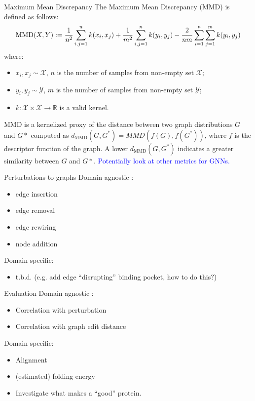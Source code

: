 \documentclass[aspectratio=169, 10pt, dvipsnames, handout]{beamer}
\begin{document}
\begin{frame}[fragile]{Maximum Mean Discrepancy}
  The Maximum Mean Discrepancy (MMD) \cite{gretton2012kernel,borgwardt2006integrating} is defined as follows:
  \begin{equation*}
    \label{eq:mmd}
    \text{MMD}(X, Y) := {1\over n^2} \sum_{i,j=1}^{n}k(x_i, x_j) + {1\over m^2} \sum_{i,j=1}^{n}k(y_i, y_j) - {2\over nm} \sum_{i=1}^{n}\sum_{j=1}^{m}k(y_i, y_j)
  \end{equation*}
  where:
  \begin{itemize}
  \item  $x_i, x_j \sim \mathcal{X}$, $n$ is the number of samples from non-empty set $\mathcal{X}$;
  \item  $y_i, y_j \sim \mathcal{Y}$, $m$ is the number of samples from non-empty set $\mathcal{Y}$;
  \item $k: \mathcal{X}\times\mathcal{X}\to\mathbb{R}$ is a valid kernel.
  \end{itemize}
  MMD is a kernelized proxy of the distance between two graph distributions $G$ and $G*$ computed as $d_{\text{MMD}}(G,G^*)=MMD(f(G),f(G^*))$, where $f$ is the descriptor function of the graph. A lower $d_{\text{MMD}}(G,G^*)$ indicates a greater similarity between $G$ and $G*$.
  \textcolor{blue}{Potentially look at other metrics for GNNs. \cite{thompson2022evaluation}}
\end{frame}

\begin{frame}[fragile]{Perturbations to graphs}
  Domain agnostic \cite{o2021evaluation}:
  \begin{itemize}
  \item edge insertion
  \item edge removal
  \item edge rewiring
  \item node addition
  \end{itemize}

  Domain specific:
  \begin{itemize}
  \item t.b.d. (e.g. add edge ``disrupting'' binding pocket, how to do this?)
  \end{itemize}
\end{frame}

\begin{frame}[fragile]{Evaluation}
  Domain agnostic \cite{o2021evaluation}:
  \begin{itemize}
  \item Correlation with perturbation
  \item Correlation with graph edit distance
  \end{itemize}

  Domain specific:
  \begin{itemize}
  \item Alignment
  \item (estimated) folding energy
  \item Investigate what makes a ``good'' protein.
  \end{itemize}
\end{frame}
\end{document}
